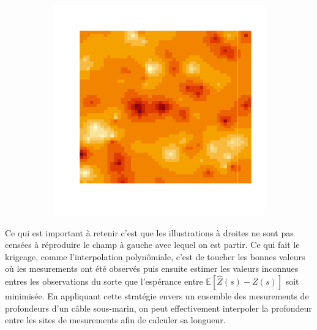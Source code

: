 \documentclass[10pt]{article} %
\begin{document}
\begin{figure}[h!]
\begin{subfigure}[b]{0.3\textwidth}
        \label{fig:three sin x}
    \end{subfigure}
    \hfill
    \begin{subfigure}[b]{0.3\textwidth}
        \centering
        \includegraphics[width=\textwidth]{media/gauss_inter_2.png}
        \label{fig:five over x}
    \end{subfigure}
       \label{fig:three graphs}
\end{figure}

Ce qui est important à retenir c'est que les illustrations à droites ne sont pas censées à réproduire le champ à gauche avec lequel
on est partir. Ce qui fait le krigeage, comme l'interpolation polynômiale, c'est de toucher les bonnes valeurs où les mesurements ont été observés puis ensuite
estimer les valeurs inconnues entres les observations du sorte que l'espérance entre $\mathbb{E}[\hat Z(s) - Z(s)]$ soit minimisée. En appliquant cette stratégie envers
un ensemble des mesurements de profondeurs d'un câble sous-marin, on peut effectivement interpoler la profondeur entre les sites de mesurements afin de calculer sa longueur.
\end{document}
